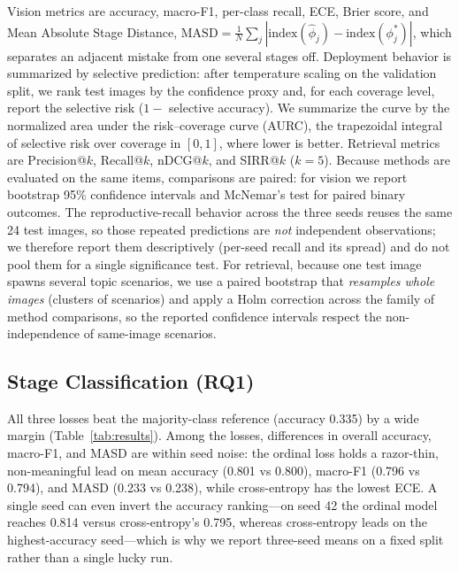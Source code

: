 \documentclass[conference]{IEEEtran}
\begin{document}
Vision metrics are accuracy, macro-F1, per-class recall, ECE, Brier score, and Mean Absolute Stage Distance, $\mathrm{MASD}=\frac{1}{N}\sum_j|\mathrm{index}(\hat{\phi}_j)-\mathrm{index}(\phi_j^*)|$, which separates an adjacent mistake from one several stages off. Deployment behavior is summarized by selective prediction: after temperature scaling on the validation split, we rank test images by the confidence proxy and, for each coverage level, report the selective risk ($1-$ selective accuracy). We summarize the curve by the normalized area under the risk--coverage curve (AURC), the trapezoidal integral of selective risk over coverage in $[0,1]$, where lower is better. Retrieval metrics are Precision@$k$, Recall@$k$, nDCG@$k$, and SIRR@$k$ ($k=5$). Because methods are evaluated on the same items, comparisons are paired: for vision we report bootstrap 95\% confidence intervals \cite{efron1993bootstrap} and McNemar's test \cite{mcnemar1947note} for paired binary outcomes. The reproductive-recall behavior across the three seeds reuses the same 24 test images, so those repeated predictions are \emph{not} independent observations; we therefore report them descriptively (per-seed recall and its spread) and do not pool them for a single significance test. For retrieval, because one test image spawns several topic scenarios, we use a paired bootstrap that \emph{resamples whole images} (clusters of scenarios) and apply a Holm correction across the family of method comparisons, so the reported confidence intervals respect the non-independence of same-image scenarios.


\subsection{Stage Classification (RQ1)}

All three losses beat the majority-class reference (accuracy 0.335) by a wide margin (Table~\ref{tab:results}). Among the losses, differences in overall accuracy, macro-F1, and MASD are within seed noise: the ordinal loss holds a razor-thin, non-meaningful lead on mean accuracy (0.801 vs 0.800), macro-F1 (0.796 vs 0.794), and MASD (0.233 vs 0.238), while cross-entropy has the lowest ECE. A single seed can even invert the accuracy ranking---on seed 42 the ordinal model reaches 0.814 versus cross-entropy's 0.795, whereas cross-entropy leads on the highest-accuracy seed---which is why we report three-seed means on a fixed split rather than a single lucky run.
\end{document}
